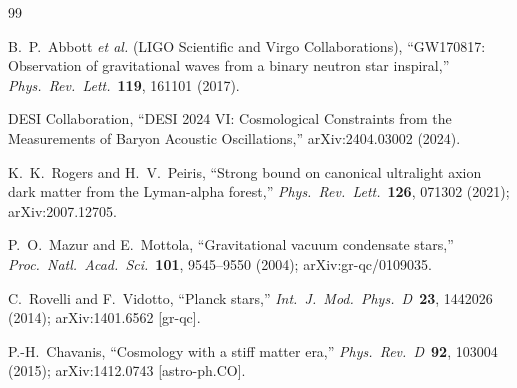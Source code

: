 \documentclass[11pt,a4paper]{article}
\theoremstyle{definition}
\theoremstyle{remark}
\begin{document}
\begin{thebibliography}{99}

B.~P.~Abbott \emph{et al.} (LIGO Scientific and Virgo Collaborations),
``GW170817: Observation of gravitational waves from a binary neutron star inspiral,''
\emph{Phys.\ Rev.\ Lett.}\ \textbf{119}, 161101 (2017).


DESI Collaboration,
``DESI 2024 VI: Cosmological Constraints from the Measurements of Baryon Acoustic Oscillations,''
arXiv:2404.03002 (2024).


K.~K.~Rogers and H.~V.~Peiris,
``Strong bound on canonical ultralight axion dark matter from the Lyman-alpha forest,''
\emph{Phys.\ Rev.\ Lett.}\ \textbf{126}, 071302 (2021);
arXiv:2007.12705.


P.~O.~Mazur and E.~Mottola, ``Gravitational vacuum condensate stars,''
\emph{Proc.\ Natl.\ Acad.\ Sci.}\ \textbf{101}, 9545--9550 (2004);
arXiv:gr-qc/0109035.

C.~Rovelli and F.~Vidotto, ``Planck stars,''
\emph{Int.\ J.\ Mod.\ Phys.\ D}\ \textbf{23}, 1442026 (2014);
arXiv:1401.6562 [gr-qc].

P.-H.~Chavanis, ``Cosmology with a stiff matter era,''
\emph{Phys.\ Rev.\ D}\ \textbf{92}, 103004 (2015);
arXiv:1412.0743 [astro-ph.CO].

\end{thebibliography}
\end{document}
